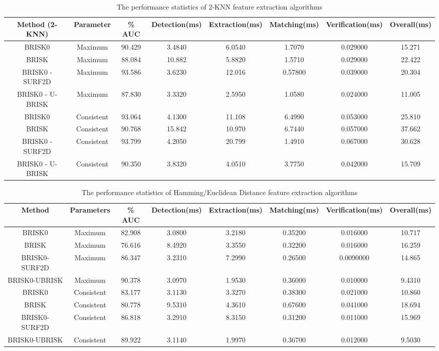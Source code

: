 \documentclass{article}
\begin{document}
\begin{table}
\centering
\caption{The performance statistics of 2-KNN feature extraction algorithms}
\footnotesize
\begin{tabular}{|c|c|c|c|c|c|c|c|}
\hline 
\textbf{Method (2-KNN)} & Parameter & \% AUC & Detection(ms) & Extraction(ms) & Matching(ms) & Verification(ms) & Overall(ms)\tabularnewline
\hline 
\hline 
BRISK0 & Maximum & 90.429 & 3.4840 & 6.0540 & 1.7070 & 0.029000 & 15.271\tabularnewline
\hline 
BRISK & Maximum & 88.084 & 10.882 & 5.8820 & 1.5710 & 0.029000 & 22.422\tabularnewline
\hline 
BRISK0 - SURF2D & Maximum & 93.586 & 3.6230 & 12.016 & 0.57800 & 0.039000 & 20.304\tabularnewline
\hline 
BRISK0 - U-BRISK & Maximum & 87.830 & 3.3320 & 2.5950 & 1.0580 & 0.024000 & 11.005\tabularnewline
\hline 
BRISK0 & Consistent & 93.064 & 4.1300 & 11.108 & 6.4990 & 0.053000 & 25.810\tabularnewline
\hline 
BRISK & Consistent & 90.768 & 15.842 & 10.970 & 6.7440 & 0.057000 & 37.662\tabularnewline
\hline 
BRISK0 - SURF2D & Consistent & 93.799 & 4.2050 & 20.799 & 1.4910 & 0.067000 & 30.628\tabularnewline
\hline 
BRISK0 - U-BRISK & Consistent & 90.350 & 3.8320 & 4.0510 & 3.7750 & 0.042000 & 15.709\tabularnewline
\hline 
\end{tabular}
\label{tab:overallknn}
\end{table}

\begin{table}
\centering
\caption{The performance statistics of Hamming/Euclidean Distance feature extraction algorithms}
\footnotesize
\begin{tabular}{|c|c|c|c|c|c|c|c|}
\hline 
Method & Parameters & \% AUC & Detection(ms) & Extraction(ms) & Matching(ms) & Verification(ms) & Overall(ms)\tabularnewline
\hline 
\hline 
BRISK0 & Maximum & 82.908 & 3.0800 & 3.2180 & 0.35200 & 0.016000 & 10.717\tabularnewline
\hline 
BRISK & Maximum & 76.616 & 8.4920 & 3.3550 & 0.32200 & 0.016000 & 16.259\tabularnewline
\hline 
BRISK0-SURF2D & Maximum & 86.347 & 3.2310 & 7.2990 & 0.26500 & 0.0090000 & 14.865\tabularnewline
\hline 
BRISK0-UBRISK & Maximum & 90.378 & 3.0970 & 1.9530 & 0.36000 & 0.010000 & 9.4310\tabularnewline
\hline 
BRISK0 & Consistent & 83.177 & 3.1130 & 3.3270 & 0.38300 & 0.021000 & 10.860\tabularnewline
\hline 
BRISK & Consistent & 80.778 & 9.5310 & 4.3610 & 0.67600 & 0.041000 & 18.694\tabularnewline
\hline 
BRISK0-SURF2D & Consistent & 86.818 & 3.2910 & 8.3150 & 0.31200 & 0.011000 & 15.969\tabularnewline
\hline 
BRISK0-UBRISK & Consistent & 89.922 & 3.1140 & 1.9970 & 0.36700 & 0.012000 & 9.5030\tabularnewline
\hline 
\end{tabular}
\label{tab:overallhammingeuclidean}
\end{table}
\end{document}
